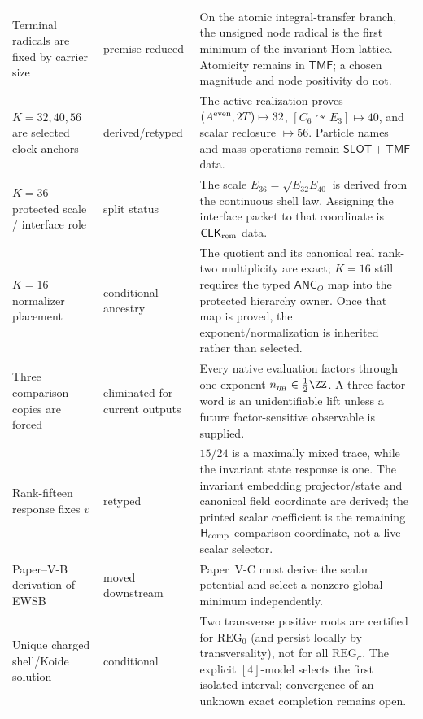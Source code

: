 \documentclass[12pt,a4paper]{article}
\newcommand{\CLKrem}{\mathsf{CLK}_{\rm rem}}
\newcommand{\etaH}{\eta_{\rm H}}
\begin{document}
\begin{longtable}{@{}L{0.29\textwidth}L{0.19\textwidth}
L{0.44\textwidth}@{}}
Terminal radicals are fixed by carrier size
& premise-reduced
& On the atomic integral-transfer branch, the unsigned node radical is the
first minimum of the invariant Hom-lattice.  Atomicity remains in
\(\mathsf{TMF}\); a chosen magnitude and node positivity do not.\\

\(K=32,40,56\) are selected clock anchors
& derived/retyped
& The active realization proves \((A^{\rm even},2T)\mapsto32\),
\([C_6\curvearrowright E_3]\mapsto40\), and
scalar reclosure \(\mapsto56\).  Particle names and mass operations remain
\(\mathsf{SLOT}+\mathsf{TMF}\) data.\\

\(K=36\) protected scale / interface role
& split status
& The scale \(E_{36}=\sqrt{E_{32}E_{40}}\) is derived from the continuous shell
law.  Assigning the interface packet to that coordinate is \(\CLKrem\) data.\\

\(K=16\) normalizer placement
& conditional ancestry
& The quotient and its canonical real rank-two multiplicity are exact; \(K=16\) still requires the typed \(\mathsf{ANC}_O\) map into the protected hierarchy owner.  Once that map is proved, the exponent/normalization is inherited rather than selected.\\

Three comparison copies are forced
& eliminated for current outputs
& Every native evaluation factors through one exponent
\(n_{\etaH}\in\tfrac12\ZZ\).  A three-factor word is an unidentifiable lift
unless a future factor-sensitive observable is supplied.\\

Rank-fifteen response fixes \(v\)
& retyped
& \(15/24\) is a maximally mixed trace, while the invariant state response is
one.  The invariant embedding projector/state and canonical field coordinate
are derived; the printed scalar coefficient is the remaining
\(\mathsf H_{\rm comp}\) comparison coordinate, not a live scalar selector.\\

Paper--V-B derivation of EWSB
& moved downstream
& Paper~V-C must derive the scalar potential and select a nonzero global
minimum independently.\\

Unique charged shell/Koide solution
& conditional
& Two transverse positive roots are certified for \(\mathrm{REG}_0\)
(and persist locally by transversality), not for all
\(\mathrm{REG}_\sigma\). The explicit \([4]\)-model selects the
first isolated interval; convergence of an unknown exact completion remains
open.\\


\end{longtable}
\end{document}
